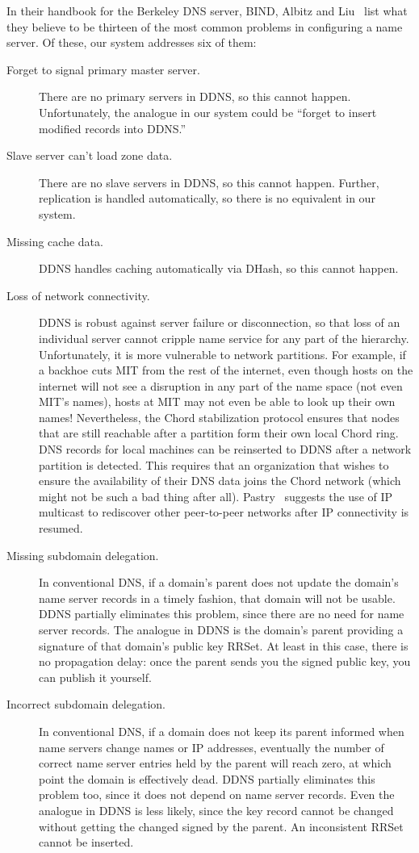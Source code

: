 In their handbook for the Berkeley DNS server, BIND,
Albitz and Liu~\cite{dns-bind} list what they believe to be
thirteen of the most common problems in configuring
a name server.
Of these, our system addresses six of them:
\begin{description}
\item[Forget to signal primary master server.]
There are no primary servers in DDNS, so this cannot happen.
Unfortunately, the analogue in our system could be ``forget to
insert modified records into DDNS.''
\item[Slave server can't load zone data.]
There are no slave servers in DDNS, so this cannot happen.
Further, replication is handled automatically, so there is no
equivalent in our system.
\item[Missing cache data.]
DDNS handles caching automatically via DHash, so this cannot happen.
\item[Loss of network connectivity.]
DDNS is robust against server failure or disconnection, so that loss of
an individual server cannot cripple name service for any part of the
hierarchy.
Unfortunately, it is more vulnerable to network partitions.
For example, if a backhoe cuts MIT from the rest of the internet,
even though hosts on the internet will not see a disruption in any
part of the name space (not even MIT's names), hosts at MIT
may not even be able to look up their own names!
Nevertheless, the Chord stabilization protocol ensures that nodes that 
are still reachable after a partition form their own local 
Chord ring. DNS records for local machines can be reinserted to
DDNS after a network partition is detected. This requires that 
an organization that wishes to ensure the availability of their
DNS data joins the Chord network (which might not be such a bad thing after all).
Pastry~\cite{pastry01} suggests the use of IP multicast to rediscover
other peer-to-peer networks after IP connectivity is resumed.
\item[Missing subdomain delegation.]
In conventional DNS, if a domain's parent does not
update the domain's name server records in a timely fashion,
that domain will not be usable.  
DDNS partially eliminates this problem, since there are 
no need for name server records.
The analogue in DDNS is the domain's parent providing a signature
of that domain's public key RRSet.
At least in this case, there is no propagation delay: once the
parent sends you the signed public key, you can publish it yourself.
\item[Incorrect subdomain delegation.]
In conventional DNS, if a domain does not keep its parent informed
when name servers change names or IP addresses, eventually 
the number of correct name server entries held by the parent
will reach zero, at which point the domain is effectively dead.
DDNS partially eliminates this problem too, since it 
does not depend on name server records.
Even the analogue in DDNS is less likely, since the key record
cannot be changed without getting the changed signed by the parent.
An inconsistent RRSet cannot be inserted.
\end{description}

